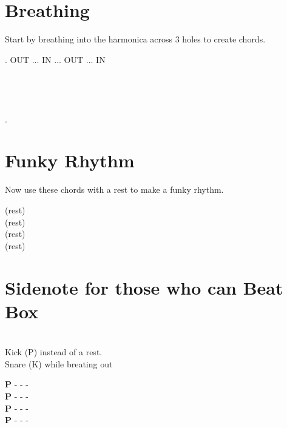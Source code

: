 \section{Breathing}
            Start by breathing into the harmonica across 3 holes to create chords.
        
        \spaceInvisDot
        \spaceInvisDot
            . OUT ... IN ... OUT ... IN \\
        \spaceInvisDot
            \ottb \ottd \ottb \ottd \\
            \ottb \ottd \ottb \ottd \\
            \ottb \ottd \ottb \ottd \\
            \ottb \ottd \ottb \ottd \\
            .
            
            
            \newpage


\section{Funky Rhythm}



        Now use these chords with a rest to make a funky rhythm. 
        
        \spaceInvisDot
            (rest) \ottd \ottb \ottd \\  
            (rest) \ottd \ottb \ottd \\  
            (rest) \ottd \ottb \ottd \\  
            (rest) \ottd \ottb \ottd \\  
            
\newpage
\section{Sidenote for those who can Beat Box}
\\
Kick (P) instead of a rest. \\
Snare (K) while breating out

        \spaceInvisDot
            \textbf{P} - \ottd - \kottb - \ottd \\  
            \textbf{P} - \ottd - \kottb - \ottd \\  
            \textbf{P} - \ottd - \kottb - \ottd \\  
            \textbf{P} - \ottd - \kottb - \ottd \\  


